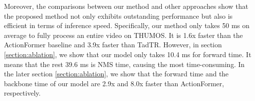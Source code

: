 \documentclass[10pt,twocolumn,letterpaper]{article}
\begin{document}
Moreover, the comparisons between our method and other approaches show that the proposed method not only exhibits outstanding performance but also is efficient in terms of inference speed. Specifically, our method only takes 50 ms on average to fully process an entire video on THUMOS. It is 1.6x faster than the ActionFormer baseline and 3.9x faster than TadTR. However, in section \ref{section:ablation}, we show that our model only takes 10.4 ms for forward time. It means that the rest 39.6 ms is NMS time, causing the most time-consuming. In the later section \ref{section:ablation}, we show that the forward time and the backbone time of our model are 2.9x and 8.0x faster than ActionFormer, respectively.

\begin{table*}[]
\centering
{}
\end{table*}
\end{document}
